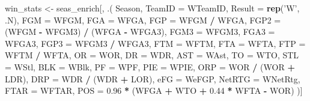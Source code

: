 \documentclass[]{article}
\newenvironment{Shaded}{\begin{snugshade}}{\end{snugshade}}
\newcommand{\KeywordTok}[1]{\textcolor[rgb]{0.13,0.29,0.53}{\textbf{#1}}}
\newcommand{\DataTypeTok}[1]{\textcolor[rgb]{0.13,0.29,0.53}{#1}}
\newcommand{\FloatTok}[1]{\textcolor[rgb]{0.00,0.00,0.81}{#1}}
\newcommand{\StringTok}[1]{\textcolor[rgb]{0.31,0.60,0.02}{#1}}
\newcommand{\OperatorTok}[1]{\textcolor[rgb]{0.81,0.36,0.00}{\textbf{#1}}}
\newcommand{\NormalTok}[1]{#1}
\begin{document}
\begin{Shaded}
\begin{Highlighting}[]
\NormalTok{win_stats <-}\StringTok{ }\NormalTok{seas_enrich[, .(}
\NormalTok{    Season,}
    \DataTypeTok{TeamID =}\NormalTok{ WTeamID,}
    \DataTypeTok{Result =} \KeywordTok{rep}\NormalTok{(}\StringTok{'W'}\NormalTok{, .N),}
    \DataTypeTok{FGM =}\NormalTok{ WFGM,}
    \DataTypeTok{FGA =}\NormalTok{ WFGA,}
    \DataTypeTok{FGP =}\NormalTok{ WFGM }\OperatorTok{/}\StringTok{ }\NormalTok{WFGA,}
    \DataTypeTok{FGP2 =}\NormalTok{ (WFGM }\OperatorTok{-}\StringTok{ }\NormalTok{WFGM3) }\OperatorTok{/}\StringTok{ }\NormalTok{(WFGA }\OperatorTok{-}\StringTok{ }\NormalTok{WFGA3),}
    \DataTypeTok{FGM3 =}\NormalTok{ WFGM3,}
    \DataTypeTok{FGA3 =}\NormalTok{ WFGA3,}
    \DataTypeTok{FGP3 =}\NormalTok{ WFGM3 }\OperatorTok{/}\StringTok{ }\NormalTok{WFGA3,}
    \DataTypeTok{FTM =}\NormalTok{ WFTM,}
    \DataTypeTok{FTA =}\NormalTok{ WFTA,}
    \DataTypeTok{FTP =}\NormalTok{ WFTM }\OperatorTok{/}\StringTok{ }\NormalTok{WFTA,}
    \DataTypeTok{OR =}\NormalTok{ WOR,}
    \DataTypeTok{DR =}\NormalTok{ WDR,}
    \DataTypeTok{AST =}\NormalTok{ WAst,}
    \DataTypeTok{TO =}\NormalTok{ WTO,}
    \DataTypeTok{STL =}\NormalTok{ WStl,}
    \DataTypeTok{BLK =}\NormalTok{ WBlk,}
    \DataTypeTok{PF =}\NormalTok{ WPF,}
    \DataTypeTok{PIE =}\NormalTok{ WPIE,}
    \DataTypeTok{ORP =}\NormalTok{ WOR }\OperatorTok{/}\StringTok{ }\NormalTok{(WOR }\OperatorTok{+}\StringTok{ }\NormalTok{LDR),}
    \DataTypeTok{DRP =}\NormalTok{ WDR }\OperatorTok{/}\StringTok{ }\NormalTok{(WDR }\OperatorTok{+}\StringTok{ }\NormalTok{LOR),}
    \DataTypeTok{eFG =}\NormalTok{ WeFGP,}
    \DataTypeTok{NetRTG =}\NormalTok{ WNetRtg,}
    \DataTypeTok{FTAR =}\NormalTok{ WFTAR,}
    \DataTypeTok{POS =} \FloatTok{0.96} \OperatorTok{*}\StringTok{ }\NormalTok{(WFGA }\OperatorTok{+}\StringTok{ }\NormalTok{WTO }\OperatorTok{+}\StringTok{ }\FloatTok{0.44} \OperatorTok{*}\StringTok{ }\NormalTok{WFTA }\OperatorTok{-}\StringTok{ }\NormalTok{WOR)}
\NormalTok{    )]}


\end{Highlighting}
\end{Shaded}
\end{document}
